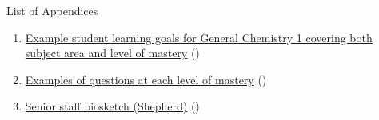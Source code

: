 \documentclass[10pt,letterpaper]{article}
\begin{document}
List of Appendices
\begin{enumerate}
\item \hyperref[app:learning_objectives]{Example student learning goals for General Chemistry 1 covering both subject area and level of mastery} ()
\item \hyperref[app:example_questions]{Examples of questions at each level of mastery} ()
\item \hyperref[app:shepherd_biosketch]{Senior staff biosketch (Shepherd)} ()
\end{enumerate}

\newpage
\raggedright\footnotesize\singlespacing
\renewcommand{\refname}{\large\textbf{References}}


% 

% 

\newpage
{}\label{app:learning_objectives}

\newpage
{}\label{app:example_questions}

\newpage
{}\label{app:shepherd_biosketch}
\end{document}
